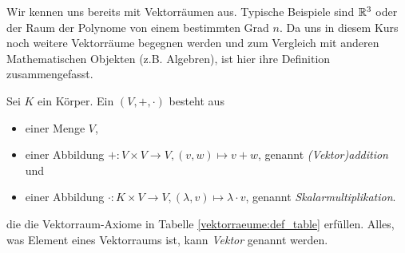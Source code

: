 Wir kennen uns bereits mit Vektorräumen aus. Typische Beispiele sind $\mathbb{R}^3$ oder der Raum der Polynome von einem bestimmten Grad $n$. Da uns in diesem Kurs noch weitere Vektorräume begegnen werden und zum Vergleich mit anderen Mathematischen Objekten (z.B. Algebren), ist hier ihre Definition zusammengefasst.


\begin{definition}\label{vektorraeume:def}
Sei $K$ ein Körper. Ein  $(V,+,\cdot)$ besteht aus
\begin{itemize}
	\item einer Menge $V$,
	\item einer Abbildung $+: V \times V \to V, (v,w) \mapsto v+w$, genannt \emph{(Vektor)addition} und
	\item einer Abbildung $\cdot: K \times V \to V, (\lambda,v) \mapsto \lambda\cdot v$, genannt \emph{Skalarmultiplikation}.
\end{itemize}
die die Vektorraum-Axiome in Tabelle \ref{vektorraeume:def_table} erfüllen. Alles, was Element eines Vektorraums ist, kann \emph{Vektor} genannt werden.

\begin{table}[!ht]
	\setlength\extrarowheight{10pt} %
	\begin{tabularx}{\textwidth}{p{7cm} X}
		

\end{tabularx}
\end{table}
\end{definition}
